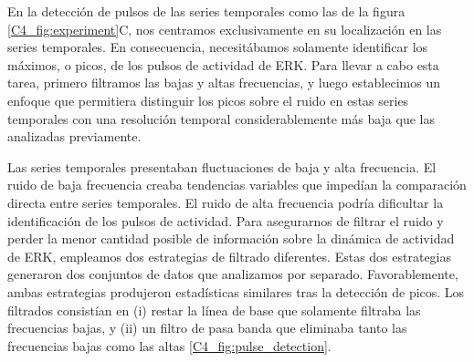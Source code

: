 \documentclass[./main.tex]{subfiles}
\begin{document}
En la detección de pulsos de las series temporales como las de la figura \ref{C4_fig:experiment}C, nos centramos exclusivamente en su localización en las series temporales. En consecuencia, necesitábamos solamente identificar los máximos, o picos, de los pulsos de actividad de ERK. Para llevar a cabo esta tarea, primero filtramos las bajas y altas frecuencias, y luego establecimos un enfoque que permitiera distinguir los picos sobre el ruido en estas series temporales con una resolución temporal considerablemente más baja que las analizadas previamente. 

Las series temporales presentaban fluctuaciones de baja y alta frecuencia. El ruido de baja frecuencia creaba tendencias variables que impedían la comparación directa entre series temporales. El ruido de alta frecuencia podría dificultar la identificación de los pulsos de actividad. Para asegurarnos de filtrar el ruido y perder la menor cantidad posible de información sobre la dinámica de actividad de ERK, empleamos dos estrategias de filtrado diferentes. Estas dos estrategias generaron dos conjuntos de datos que analizamos por separado. Favorablemente, ambas estrategias produjeron estadísticas similares tras la detección de picos. Los filtrados consistían en (i) restar la línea de base que solamente filtraba las frecuencias bajas, y (ii) un filtro de pasa banda que eliminaba tanto las frecuencias bajas como las altas \ref{C4_fig:pulse_detection}. 
\end{document}
